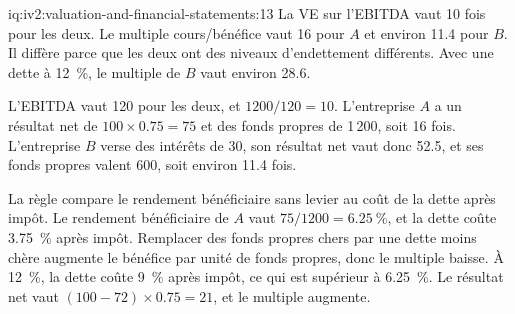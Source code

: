 \begin{solution}{iq:iv2:valuation-and-financial-statements:13}
La VE sur l'EBITDA vaut 10 fois pour les deux. Le multiple cours/bénéfice vaut 16 pour $A$ et environ 11.4 pour $B$. Il diffère parce que les deux ont des niveaux d'endettement différents. Avec une dette à 12~\%, le multiple de $B$ vaut environ 28.6.

L'EBITDA vaut 120 pour les deux, et $1200/120 = 10$. L'entreprise $A$ a un résultat net de $100 \times 0.75 = 75$ et des fonds propres de 1\,200, soit 16 fois. L'entreprise $B$ verse des intérêts de 30, son résultat net vaut donc 52.5, et ses fonds propres valent 600, soit environ 11.4 fois.

La règle compare le rendement bénéficiaire sans levier au coût de la dette après impôt. Le rendement bénéficiaire de $A$ vaut $75/1200 = 6.25~\%$, et la dette coûte 3.75~\% après impôt. Remplacer des fonds propres chers par une dette moins chère augmente le bénéfice par unité de fonds propres, donc le multiple baisse. À 12~\%, la dette coûte 9~\% après impôt, ce qui est supérieur à 6.25~\%. Le résultat net vaut $(100 - 72) \times 0.75 = 21$, et le multiple augmente.

\end{solution}

